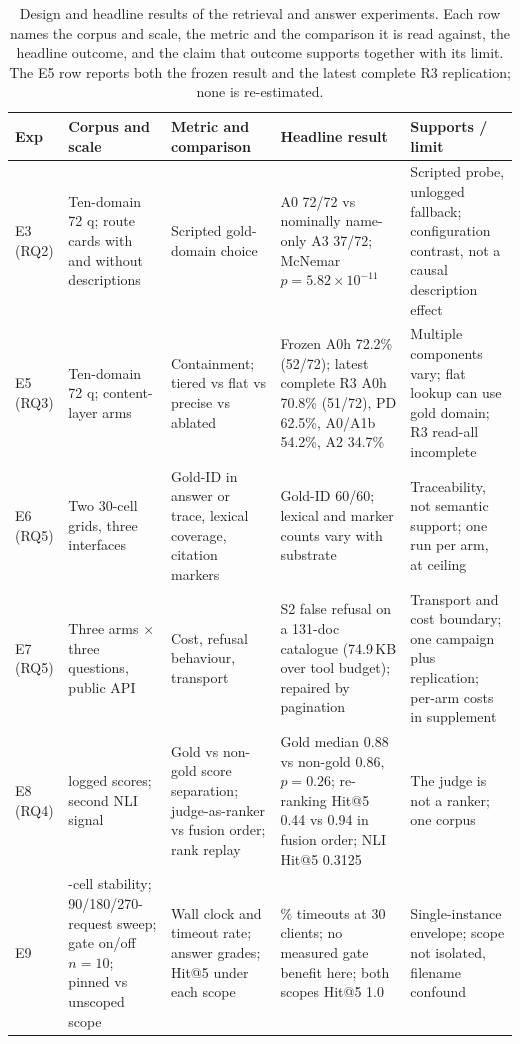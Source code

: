 \documentclass[final,5p,times,twocolumn]{elsarticle}
\begin{document}
\begin{table}[t]
\centering
\footnotesize
\setlength{\tabcolsep}{4pt}
\caption{Design and headline results of the retrieval and answer experiments.
Each row names the corpus and scale, the metric and the comparison it is read
against, the headline outcome, and the claim that outcome supports together
with its limit. The E5 row reports both the frozen result and the latest
complete R3 replication; none is re-estimated.}
\label{tab:retrieval-design}
\begin{tabular}{@{}>{\raggedright\arraybackslash}p{}>{\raggedright\arraybackslash}p{}>{\raggedright\arraybackslash}p{}>{\raggedright\arraybackslash}p{}>{\raggedright\arraybackslash}p{}@{}}
\toprule
Exp & Corpus and scale & Metric and comparison & Headline result & Supports / limit\\
\midrule
E3 (RQ2) & Ten-domain 72 q; route cards with and without descriptions & Scripted gold-domain choice & A0 72/72 vs nominally name-only A3 37/72; McNemar $p=5.82\times10^{-11}$ & Scripted probe, unlogged fallback; configuration contrast, not a causal description effect\\
E5 (RQ3) & Ten-domain 72 q; content-layer arms & Containment; tiered vs flat vs precise vs ablated & Frozen A0h 72.2\% (52/72); latest complete R3 A0h 70.8\% (51/72), PD 62.5\%, A0/A1b 54.2\%, A2 34.7\% & Multiple components vary; flat lookup can use gold domain; R3 read-all incomplete\\
E6 (RQ5) & Two 30-cell grids, three interfaces & Gold-ID in answer or trace, lexical coverage, citation markers & Gold-ID 60/60; lexical and marker counts vary with substrate & Traceability, not semantic support; one run per arm, at ceiling\\
E7 (RQ5) & Three arms $\times$ three questions, public API & Cost, refusal behaviour, transport & S2 false refusal on a 131-doc catalogue (74.9\,KB over tool budget); repaired by pagination & Transport and cost boundary; one campaign plus replication; per-arm costs in supplement\\
E8 (RQ4) & 191 logged scores; second NLI signal & Gold vs non-gold score separation; judge-as-ranker vs fusion order; rank replay & Gold median 0.88 vs non-gold 0.86, $p=0.26$; re-ranking Hit@5 0.44 vs 0.94 in fusion order; NLI Hit@5 0.3125 & The judge is not a ranker; one corpus\\
E9 & 27-cell stability; 90/180/270-request sweep; gate on/off $n=10$; pinned vs unscoped scope & Wall clock and timeout rate; answer grades; Hit@5 under each scope & 41\% timeouts at 30 clients; no measured gate benefit here; both scopes Hit@5 1.0 & Single-instance envelope; scope not isolated, filename confound\\
\bottomrule
\end{tabular}
\end{table}
\end{document}

